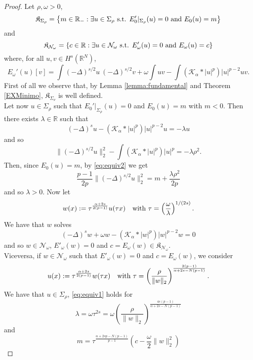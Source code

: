 \documentclass[10pt]{amsart}
\numberwithin{equation}{section}
\begin{document}
\begin{proof}
	Let $\rho,\omega>0$, 
	\[
	\mathfrak{K}_{\Sigma_{\rho}}
	=\left\{
	m \in \mathbb{R}_- :
	\exists u \in \Sigma_{\rho} \hbox{ s.t. } E_0'|_{\Sigma_{\rho}}(u)=0 \hbox{ and } E_0(u)=m
	\right\}
	\]
	and
	\[
	\mathfrak{K}_{\mathcal{N}_\omega}
	=\left\{
	c \in \mathbb{R} : 
	\exists u \in \mathcal{N}_\omega \hbox{ s.t. } E_\omega'(u)=0 \hbox{ and }  E_\omega(u)=c
	\right\}
	\]
	where, for all $u,v\in {H^{s}(\mathbb R^{N})}$,
	\[
	E_{\omega}'(u)[v]=\int (-\Delta)^{s/2} u \ (-\Delta)^{s/2} v+\omega\int uv -\int {{(\mathcal K_{\alpha}*|u|^{p})}} |u|^{p-2} u v.
	\]
	First of all we observe that, by Lemma \ref{lemma:fundamental}
	and Theorem \ref{EXMinimo}, 
	$\mathfrak{K}_{\Sigma_{\nu}}$ is well defined.\\
	Let now $u \in \Sigma_{\rho}$ such that  $E_0'|_{\Sigma_{\rho}}(u)=0$  and $E_0(u)=m$ with $m<0$. Then there exists $\lambda \in \mathbb{R}$ such that
	\begin{equation}
	\label{eq:equiv1}
	(-\Delta)^s u - (\mathcal{K}_\alpha * |u|^p)|u|^{p-2} u = -\lambda u
	\end{equation}
	and so
	\begin{equation}
	\label{eq:equiv2}
	\| (-\Delta)^{s/2} u \|_2^2 - \int(\mathcal{K}_\alpha * |u|^p)|u|^p = -\lambda \rho^2.
	\end{equation}
	Then, since $E_0(u)=m$, by \eqref{eq:equiv2} we get
	\begin{equation}
	\label{49bis}
	\frac{p-1}{2p} \| (-\Delta)^{s/2} u \|_2^2= m + \frac{\lambda \rho^2}{2p}
	\end{equation}
	and so $\lambda > 0$.
	Now let
	\[
	w(x):= \tau^{\frac{\alpha+2s}{2(p-1)}} u (\tau x)
	\quad \hbox{with } \tau=\left(\frac{\omega}{\lambda}\right)^{1/(2s)}.
	\]
	We have that $w$ solves
	\[
	(- \Delta)^s w + \omega w - (\mathcal{K}_\alpha * |w|^p)|w|^{p-2} w = 0
	\]
	and so $w\in \mathcal{N}_\omega$, $E'_{\omega}(w)=0$ and $c=E_{\omega}(w)\in  \mathfrak{K}_{\mathcal{N}_{\omega}}$.\\
	Viceversa, if $w\in \mathcal{N}_{\omega}$ such that $E'_{\omega}(w)=0$ and $c=E_{\omega}(w)$, we consider 
	\[
	u(x):= \tau^\frac{\alpha+2s}{2(p-1)} w (\tau x)
	\quad \hbox{with } \tau=\left(\frac{\rho}{\|w\|_2}\right)^\frac{2(p-1)}{\alpha + 2s - N(p-1)}.
	\]
	We have that $u\in \Sigma_\rho$, \eqref{eq:equiv1} holds for
	\[
	\lambda=\omega\tau^{2s}=\omega\left(\frac{\rho}{\|w\|_2}\right)^\frac{4s(p-1)}{\alpha + 2s - N(p-1)}
	\]
	and
	\begin{equation}
	\label{eq:equiv4}
	m =
	\tau^\frac{\alpha+2sp-N(p-1)}{p-1} \left(c-\frac{\omega}{2}\|w\|_2^2\right)

\end{equation}
\end{proof}
\end{document}
